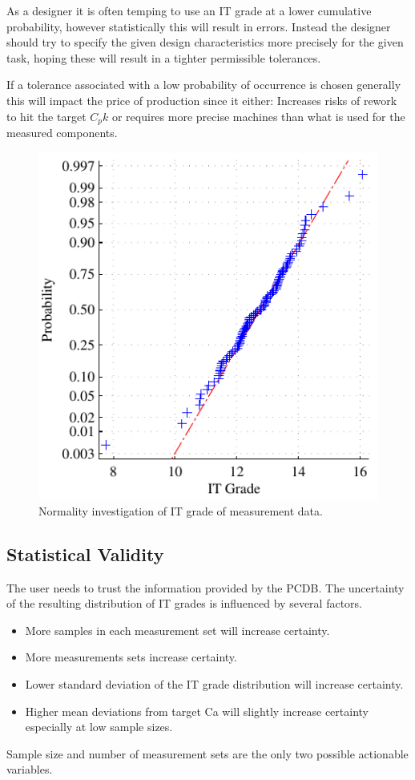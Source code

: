 \documentclass[aip,amsmath, reprint, author-year]{revtex4-1}
\begin{document}
As a designer it is often temping to use an IT grade at a lower cumulative probability, however statistically this will result in errors. Instead the designer should try to specify the given design characteristics more precisely for the given task, hoping these will result in a tighter permissible tolerances.

If a tolerance associated with a low probability of occurrence is chosen generally this will impact the price of production since it either: Increases risks of rework to hit the target $C_pk$ or requires more precise machines than what is used for the measured components.

\begin{figure}
\includegraphics{Normal_plot.pdf}
\caption{\label{fig:normplot} Normality investigation of IT grade of measurement data.}
\end{figure}

\subsection{Statistical Validity}
The user needs to trust the information provided by the PCDB. The uncertainty of the resulting distribution of IT grades is influenced by several factors.

\begin{itemize}
\item More samples in each measurement set will increase certainty. 
\item More measurements sets increase certainty. 
\item Lower standard deviation of the IT grade distribution will increase certainty.
\item Higher mean deviations from target Ca will slightly increase certainty especially at low sample sizes. 
\end{itemize}
Sample size and number of measurement sets are the only two possible actionable variables. 
\end{document}
